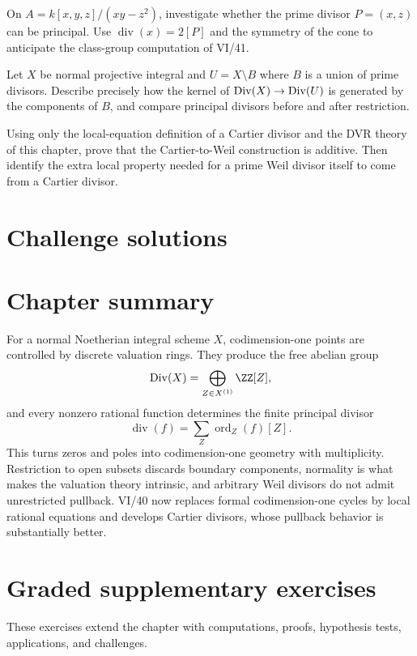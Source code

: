 \begin{problem}\label{chal:vi39-3}
On \(A=k[x,y,z]/(xy-z^2)\), investigate whether the prime divisor \(P=(x,z)\) can be principal.  Use \(\operatorname{div}(x)=2[P]\) and the symmetry of the cone to anticipate the class-group computation of VI/41.
\end{problem}

\begin{problem}\label{chal:vi39-4}
Let \(X\) be normal projective integral and \(U=X\setminus B\) where \(B\) is a union of prime divisors.  Describe precisely how the kernel of \(\operatorname{Div}(X)\to\operatorname{Div}(U)\) is generated by the components of \(B\), and compare principal divisors before and after restriction.
\end{problem}

\begin{problem}\label{chal:vi39-5}
Using only the local-equation definition of a Cartier divisor and the DVR theory of this chapter, prove that the Cartier-to-Weil construction is additive.  Then identify the extra local property needed for a prime Weil divisor itself to come from a Cartier divisor.
\end{problem}
\ifdefined\IncludeChallengeSolutions
\section{Challenge solutions}

\fi
\section*{Chapter summary}
For a normal Noetherian integral scheme \(X\), codimension-one points are controlled by discrete valuation rings.  They produce the free abelian group
\[
\Div(X)=\bigoplus_{Z\in X^{(1)}}\ZZ[Z],
\]
and every nonzero rational function determines the finite principal divisor
\[
\operatorname{div}(f)=\sum_Z\operatorname{ord}_Z(f)[Z].
\]
This turns zeros and poles into codimension-one geometry with multiplicity.  Restriction to open subsets discards boundary components, normality is what makes the valuation theory intrinsic, and arbitrary Weil divisors do not admit unrestricted pullback.  VI/40 now replaces formal codimension-one cycles by local rational equations and develops Cartier divisors, whose pullback behavior is substantially better.
\section{Graded supplementary exercises}
These exercises extend the chapter with computations, proofs, hypothesis tests, applications, and challenges.

